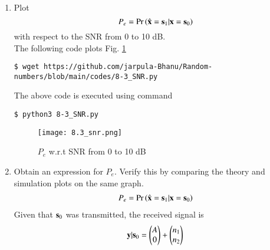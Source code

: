 \documentclass[journal,12pt,twocolumn]{IEEEtran}
\renewcommand\thesection{\arabic{section}}
\begin{document}
\begin{enumerate}[label=\thesection.\arabic*
,ref=\thesection.\theenumi]
    \begin{align}
    \label{eq:map_bfsk_dec}
    p\brak{\vec{y}|s_0} &\dec{s_0}{s_1} p\brak{\vec{y}|s_1}
    \end{align}
    Using (\ref{gauss_mutl_var1}) and (\ref{gauss_mutl_var2}) and substituting the values from (\ref{rho_sig_val}),  we get
    \begin{align}
    (y_1 -A)^2 + y_2^2 \dec{s_1}{s_0} y_1^2 + (y_2 - A)^2
    \end{align}
    On simplifying, we get the decision rule is
    \begin{align}
    \label{eq:decision_rule}
    y_1 \dec{s_0}{s_1} y_2
    \end{align}

\item
Plot 
\begin{equation} 
P_e = \Pr\left(\hat{\mathbf{x}} = \mathbf{s}_1|\mathbf{x} = \mathbf{s}_0\right)
\end{equation}
with respect to the SNR from 0 to 10 dB.\\
%
\solution The following code plots Fig. \ref{fig:8.3_snr}\\
\begin{lstlisting}
$ wget https://github.com/jarpula-Bhanu/Random-numbers/blob/main/codes/8-3_SNR.py
\end{lstlisting}
The above code is executed using command
\begin{lstlisting}
$ python3 8-3_SNR.py
\end{lstlisting}
\begin{figure}[h]
    \centering
    \texttt{[image: 8.3\_snr.png]}
    \caption{$P_e$ w.r.t SNR from 0 to 10 dB}
    \label{fig:8.3_snr}
\end{figure}
\item
Obtain an expression for $P_e$. Verify this by comparing the theory and simulation plots on the same graph.\\
%
\solution 
\begin{align}
P_e = \Pr\left(\hat{\mathbf{x}} = \mathbf{s}_1|\mathbf{x} = \mathbf{s}_0\right)
\end{align}
Given that $\mathbf{s}_0$ was transmitted, the received signal is
\begin{align}
\mbf{y}|\mbf{s}_0 = \begin{pmatrix} A \\ 0 \end{pmatrix} + \begin{pmatrix} n_1 \\ n_2 \end{pmatrix}

\end{align}
\end{enumerate}
\end{document}
